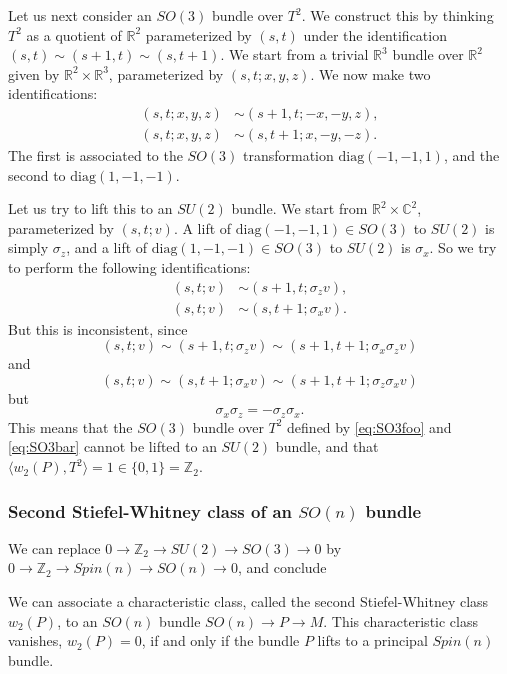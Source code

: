 \documentclass[12pt]{article}
\numberwithin{equation}{section}
\numberwithin{figure}{section}
\theoremstyle{remark}
\def\bC{\mathbb{C}}
\def\bR{\mathbb{R}}
\def\bZ{\mathbb{Z}}
\begin{document}
Let us next consider an $SO(3)$ bundle over $T^2$.
We construct this by thinking $T^2$ as a quotient of $\bR^2$ parameterized by $(s,t)$ under the identification $(s,t)\sim (s+1,t)\sim (s,t+1)$.
We start from a trivial $\bR^3$ bundle over $\bR^2$ given by
$\bR^2\times \bR^3$, parameterized by $(s,t;x,y,z)$.
We now make two identifications:
\begin{align}
  (s,t;x,y,z) &\sim (s+1,t;-x,-y,z),\label{eq:SO3foo}\\
  (s,t;x,y,z) &\sim (s,t+1;x,-y,-z).\label{eq:SO3bar}
\end{align}
The first is associated to the $SO(3)$ transformation $\mathrm{diag}(-1,-1,1)$,
and the second to $\mathrm{diag}(1,-1,-1)$.

Let us try to lift this to an $SU(2)$ bundle. 
We start from $\bR^2\times \bC^2$, parameterized by $(s,t;v)$.
A lift of $\mathrm{diag}(-1,-1,1)\in SO(3)$ to $SU(2)$ is simply $\sigma_z$,
and a lift of $\mathrm{diag}(1,-1,-1)\in SO(3)$ to $SU(2)$ is $\sigma_x$.
So we try to perform the following identifications:
\begin{align}
  (s,t;v) &\sim (s+1,t;\sigma_z v),\\
  (s,t;v) &\sim (s,t+1;\sigma_x v).
\end{align}
But this is inconsistent, since \begin{equation}
  (s,t;v)\sim (s+1,t;\sigma_z v)\sim (s+1,t+1;\sigma_x\sigma_z v)
\end{equation} and \begin{equation}
  (s,t;v)\sim (s,t+1;\sigma_x v)\sim (s+1,t+1;\sigma_z\sigma_x v)
\end{equation} but \begin{equation}
  \sigma_x\sigma_z = - \sigma_z\sigma_x.
\end{equation}
This means that the $SO(3)$ bundle over $T^2$ defined by \eqref{eq:SO3foo} and \eqref{eq:SO3bar} cannot be lifted to an $SU(2)$ bundle,
and that $\langle w_2(P),T^2\rangle=1 \in \{0,1\}=\bZ_2$.

\subsubsection{Second Stiefel-Whitney class of an $SO(n)$ bundle}


We can replace $0\to \bZ_2\to SU(2)\to SO(3)\to 0$ by $0\to \bZ_2\to Spin(n)\to SO(n)\to 0$, and conclude 
\begin{proposition}
  We can associate a characteristic class, called
  the second Stiefel-Whitney class $w_2(P)$,
  to an $SO(n)$ bundle $SO(n)\to P\to M$.
  This characteristic class vanishes, $w_2(P)=0$, if and only if the bundle $P$ lifts to a principal $Spin(n)$ bundle.
\end{proposition}
\end{document}
